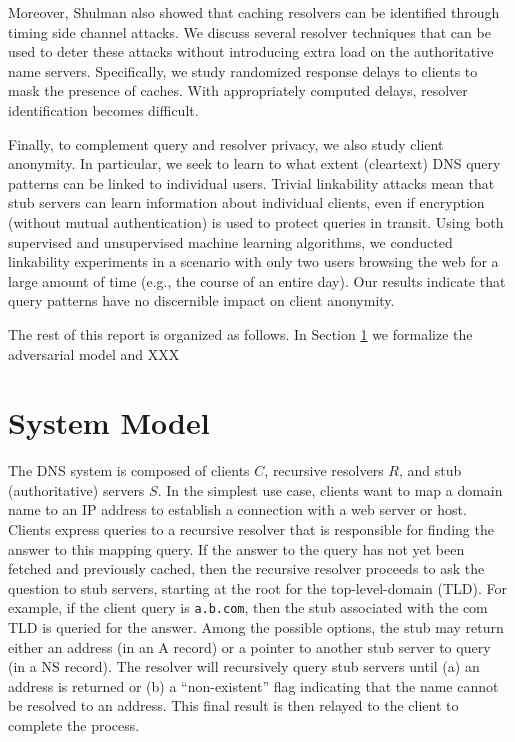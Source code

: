 \documentclass{llncs}
\begin{document}
Moreover, Shulman also showed that caching resolvers can be identified through timing side channel
attacks. We discuss several resolver techniques that can be used to deter these attacks
without introducing extra load on the authoritative name servers. Specifically, we study
randomized response delays to clients to mask the presence of caches. With
appropriately computed delays, resolver identification becomes difficult.

Finally, to complement query and resolver privacy, we also study client anonymity. In particular, we seek to
learn to what extent (cleartext) DNS query patterns can be linked to individual users.
Trivial linkability attacks mean that stub servers can learn information about individual
clients, even if encryption (without mutual authentication) is used to protect queries
in transit. Using both supervised and unsupervised machine learning algorithms,
we conducted linkability experiments in a scenario with only two users browsing the web
for a large amount of time (e.g., the course of an entire day). Our results indicate that
query patterns have no discernible impact on client anonymity.



The rest of this report is organized as follows. In Section \ref{sec:model} we formalize
the adversarial model and XXX

\section{System Model}\label{sec:model}
The DNS system is composed of clients $C$, recursive resolvers $R$, and stub (authoritative)
servers $S$. In the simplest use case, clients want to map a domain name to an IP address to
establish a connection with a web server or host. Clients express queries to a recursive
resolver that is responsible for finding the answer to this mapping query. If the answer
to the query has not yet been fetched and previously cached, then the recursive resolver
proceeds to ask the question to stub servers, starting at the root for the top-level-domain (TLD).
For example, if the client query is {\tt a.b.com}, then the stub associated with the com
TLD is queried for the answer. Among the possible options, the stub may return either an
address (in an A record) or a pointer to another stub server to query (in a NS record).
The resolver will recursively query stub servers until (a) an address is returned or (b)
a ``non-existent'' flag indicating that the name cannot be resolved to an address. This
final result is then relayed to the client to complete the process.
\end{document}
